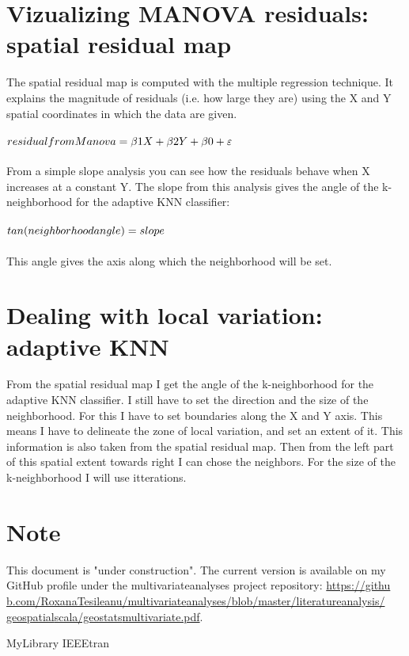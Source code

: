 \documentclass {article}
\begin{document}
\section{Vizualizing MANOVA residuals: spatial residual map}
The spatial residual map is computed with the multiple regression technique. It explains the magnitude of residuals (i.e. how large they are) using the X and Y spatial coordinates in which the data are given.
\\
\\
$residual\underline{\space}from\underline{\space}Manova = \beta1 X + \beta2 Y + \beta0 + \varepsilon$
\\
\\
From a simple slope analysis you can see how the residuals behave when X increases at a constant Y.
 The slope from this analysis gives the angle of the k-neighborhood for the adaptive KNN classifier:
\\
\\
$ tan(neighborhood\underline{\space}angle) = slope $
\\
\\
This angle gives the axis along which the neighborhood will be set.
   
\section{Dealing with local variation: adaptive KNN}
From the spatial residual map I get the angle of the k-neighborhood for the adaptive KNN classifier. I still have to set the direction and the size of the neighborhood. For this I have to set boundaries along the X and Y axis. This means I have to delineate the zone of local variation, and set an extent of it. This information is also taken from the spatial residual map. Then from the left part of this spatial extent towards right I can chose the neighbors. For the size of the k-neighborhood I will use itterations.        
\section* {Note}
This document is "under construction". The current version is available on my GitHub profile under the multivariate\underline{\space}analyses project repository: \href{https://github.com/RoxanaTesileanu/multivariate_analyses/blob/master/literature_analysis/geospatial_scala/geostats_multivariate.pdf}{https://githu\\b.com/RoxanaTesileanu/multivariate\underline{\space}analyses/blob/master/literature\underline{\space}analysis/\\geospatial\underline{\space}scala/geostats\underline{\space}multivariate.pdf}.

 {MyLibrary}
 {IEEEtran}
\end{document}
